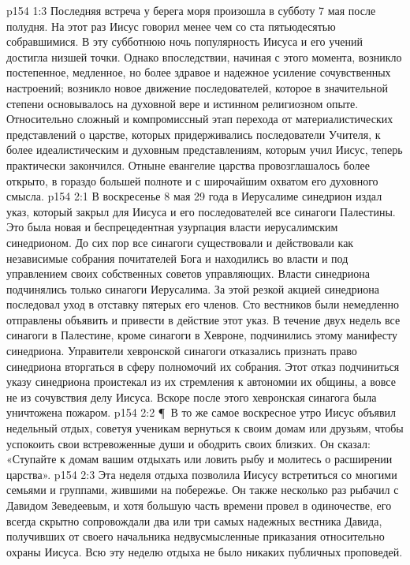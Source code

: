 \vs p154 1:3 Последняя встреча у берега моря произошла в субботу 7 мая после полудня. На этот раз Иисус говорил менее чем со ста пятьюдесятью собравшимися. В эту субботнюю ночь популярность Иисуса и его учений достигла низшей точки. Однако впоследствии, начиная с этого момента, возникло постепенное, медленное, но более здравое и надежное усиление сочувственных настроений; возникло новое движение последователей, которое в значительной степени основывалось на духовной вере и истинном религиозном опыте. Относительно сложный и компромиссный этап перехода от материалистических представлений о царстве, которых придерживались последователи Учителя, к более идеалистическим и духовным представлениям, которым учил Иисус, теперь практически закончился. Отныне евангелие царства провозглашалось более открыто, в гораздо большей полноте и с широчайшим охватом его духовного смысла.
\vs p154 2:1 В воскресенье 8 мая 29 года в Иерусалиме синедрион издал указ, который закрыл для Иисуса и его последователей все синагоги Палестины. Это была новая и беспрецедентная узурпация власти иерусалимским синедрионом. До сих пор все синагоги существовали и действовали как независимые собрания почитателей Бога и находились во власти и под управлением своих собственных советов управляющих. Власти синедриона подчинялись только синагоги Иерусалима. За этой резкой акцией синедриона последовал уход в отставку пятерых его членов. Сто вестников были немедленно отправлены объявить и привести в действие этот указ. В течение двух недель все синагоги в Палестине, кроме синагоги в Хевроне, подчинились этому манифесту синедриона. Управители хевронской синагоги отказались признать право синедриона вторгаться в сферу полномочий их собрания. Этот отказ подчиниться указу синедриона проистекал из их стремления к автономии их общины, а вовсе не из сочувствия делу Иисуса. Вскоре после этого хевронская синагога была уничтожена пожаром.
\vs p154 2:2 \P\ В то же самое воскресное утро Иисус объявил недельный отдых, советуя ученикам вернуться к своим домам или друзьям, чтобы успокоить свои встревоженные души и ободрить своих близких. Он сказал: «Ступайте к домам вашим отдыхать или ловить рыбу и молитесь о расширении царства».
\vs p154 2:3 Эта неделя отдыха позволила Иисусу встретиться со многими семьями и группами, жившими на побережье. Он также несколько раз рыбачил с Давидом Зеведеевым, и хотя большую часть времени провел в одиночестве, его всегда скрытно сопровождали два или три самых надежных вестника Давида, получивших от своего начальника недвусмысленные приказания относительно охраны Иисуса. Всю эту неделю отдыха не было никаких публичных проповедей.
